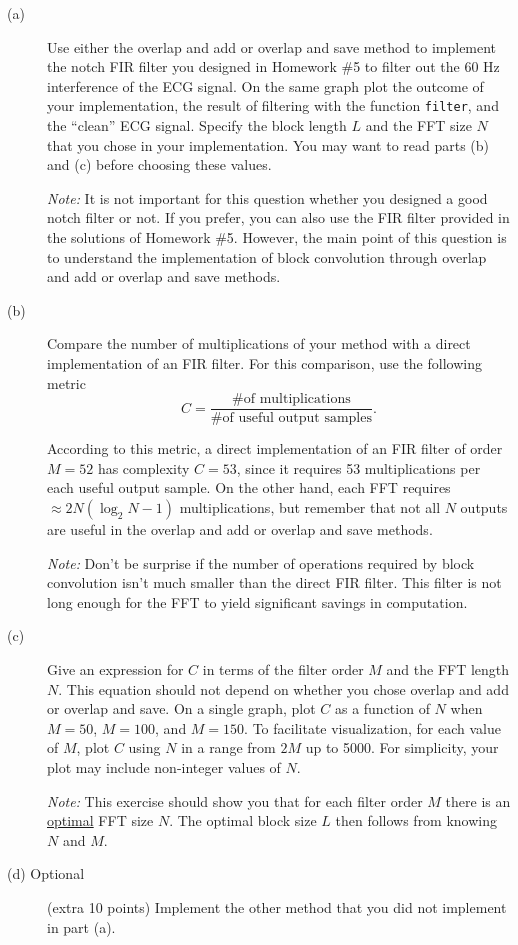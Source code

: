 \documentclass[12pt]{report}
\begin{document}
\begin{description}
	\item[(a)] Use either the overlap and add or overlap and save method to implement the notch FIR filter you designed in Homework \#5 to filter out the 60 Hz interference of the ECG signal. On the same graph plot the outcome of your implementation, the result of filtering with the function \texttt{filter}, and the ``clean'' ECG signal. Specify the block length $L$ and the FFT size $N$ that you chose in your implementation. You may want to read parts (b) and (c) before choosing these values. 
	
	\noindent\textit{Note:} It is not important for this question whether you designed a good notch filter or not. If you prefer, you can also use the FIR filter provided in the solutions of Homework \#5. However, the main point of this question is to understand the implementation of block convolution through overlap and add or overlap and save methods.
	
	\item [(b)] Compare the number of multiplications of your method with a direct implementation of an FIR filter. For this comparison, use the following metric
	\begin{equation}
		C = \frac{\text{\# of multiplications}}{\text{\# of useful output samples}}.
	\end{equation} 
	
	According to this metric, a direct implementation of an FIR filter of order $M = 52$ has complexity $C = 53$, since it requires 53 multiplications per each useful output sample. On the other hand, each FFT requires $\approx 2N(\log_2N-1)$ multiplications, but remember that not all $N$ outputs are useful in the overlap and add or overlap and save methods.
	
	\noindent\textit{Note:} Don't be surprise if the number of operations required by block convolution isn't much smaller than the direct FIR filter. This filter is not long enough for the FFT to yield significant savings in computation.
	
	\item [(c)] Give an expression for $C$ in terms of the filter order $M$ and the FFT length $N$. This equation should not depend on whether you chose overlap and add or overlap and save. On a single graph, plot $C$ as a function of $N$ when $M = 50$, $M = 100$, and $M = 150$. To facilitate visualization, for each value of $M$, plot $C$ using $N$ in a range from $2M$ up to 5000. For simplicity, your plot may include non-integer values of $N$.
	
	\noindent\textit{Note:} This exercise should show you that for each filter order $M$ there is an \underline{optimal} FFT size $N$. The optimal block size $L$ then follows from knowing $N$ and $M$.
		
	\item[(d) Optional] (extra 10 points) Implement the other method that you did not implement in part (a).
\end{description}
\end{document}
